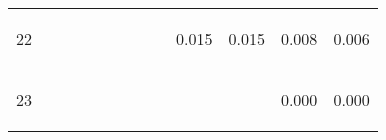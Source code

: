 \begin{center}
\begin{tabular}{lcccccccccccc}
22 & \begin{bf}\end{bf} & \begin{rm}\end{rm} & \begin{bf}\end{bf} & \begin{rm}\end{rm} & \begin{bf}\end{bf} & \begin{rm}\end{rm} & \begin{bf}\end{bf} & \begin{rm}\end{rm} & \begin{bf}0.015\end{bf} & \begin{rm}0.015\end{rm} & \begin{bf}0.008\end{bf} & \begin{rm}0.006\end{rm}\\
23 & \begin{bf}\end{bf} & \begin{rm}\end{rm} & \begin{bf}\end{bf} & \begin{rm}\end{rm} & \begin{bf}\end{bf} & \begin{rm}\end{rm} & \begin{bf}\end{bf} & \begin{rm}\end{rm} & \begin{bf}\end{bf} & \begin{rm}\end{rm} & \begin{bf}0.000\end{bf} & \begin{rm}0.000\end{rm}\\

\end{tabular}
\end{center}
